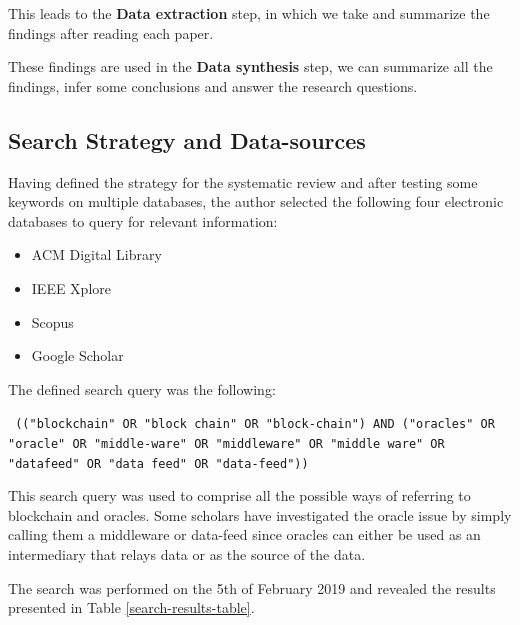 This leads to the \textbf{Data extraction} step, in which we take and summarize the findings after reading each paper.

These findings are used in the \textbf{Data synthesis} step, we can summarize all the findings, infer some conclusions and answer the research questions.

\subsection{Search Strategy and Data-sources}

Having defined the strategy for the systematic review and after testing some keywords on multiple databases, the author selected the following four electronic databases to query for relevant information:

\begin{itemize}
  \item ACM Digital Library
  \item IEEE Xplore
  \item Scopus
  \item Google Scholar
\end{itemize}


The defined search query was the following:

\texttt{
  (("blockchain" OR "block chain" OR "block-chain")
  AND
  ("oracles" OR "oracle" OR "middle-ware" OR "middleware" OR "middle ware" OR "datafeed" OR "data feed" OR "data-feed"))
}

This search query was used to comprise all the possible ways of referring to blockchain and oracles. Some scholars have investigated the oracle issue by simply calling them a middleware or data-feed since oracles can either be used as an intermediary that relays data or as the source of the data.

The search was performed on the 5th of February 2019 and revealed the results presented in Table \ref{search-results-table}.


